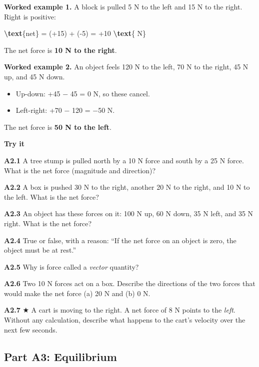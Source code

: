 \documentclass[
]{article}
\newenvironment{Shaded}{\begin{snugshade}}{\end{snugshade}}
\newcommand{\FunctionTok}[1]{\textcolor[rgb]{0.13,0.29,0.53}{\textbf{#1}}}
\newcommand{\NormalTok}[1]{#1}
\providecommand{\tightlist}{%
  \setlength{\itemsep}{0pt}\setlength{\parskip}{0pt}}
\begin{document}
\textbf{Worked example 1.} A block is pulled 5 N to the left and 15 N to
the right. Right is positive:

\begin{Shaded}
\begin{Highlighting}[]
\FunctionTok{\textbackslash{}text}\NormalTok{\{net\} = (+15) + ({-}5) = +10 }\FunctionTok{\textbackslash{}text}\NormalTok{\{ N\}}
\end{Highlighting}
\end{Shaded}

The net force is \textbf{10 N to the right}.

\textbf{Worked example 2.} An object feels 120 N to the left, 70 N to
the right, 45 N up, and 45 N down.

\begin{itemize}
\tightlist
\item
  Up-down: +45 − 45 = 0 N, so these cancel.
\item
  Left-right: +70 − 120 = −50 N.
\end{itemize}

The net force is \textbf{50 N to the left}.

\textbf{Try it}

\textbf{A2.1} A tree stump is pulled north by a 10 N force and south by
a 25 N force. What is the net force (magnitude and direction)?

\textbf{A2.2} A box is pushed 30 N to the right, another 20 N to the
right, and 10 N to the left. What is the net force?

\textbf{A2.3} An object has these forces on it: 100 N up, 60 N down, 35
N left, and 35 N right. What is the net force?

\textbf{A2.4} True or false, with a reason: ``If the net force on an
object is zero, the object must be at rest.''

\textbf{A2.5} Why is force called a \emph{vector} quantity?

\textbf{A2.6} Two 10 N forces act on a box. Describe the directions of
the two forces that would make the net force (a) 20 N and (b) 0 N.

\textbf{A2.7} ★ A cart is moving to the right. A net force of 8 N points
to the \emph{left}. Without any calculation, describe what happens to
the cart's velocity over the next few seconds.

\subsection{Part A3: Equilibrium}\label{part-a3-equilibrium}
\end{document}
